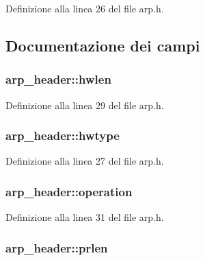 Definizione alla linea 26 del file arp.\+h.



\subsection{Documentazione dei campi}
\hypertarget{structarp__header_ad11b0f96095d8f44e6b21aaa3938df1f}{
\subsubsection[{hwlen}]{ arp\+\_\+header\+::hwlen}}\label{structarp__header_ad11b0f96095d8f44e6b21aaa3938df1f}


Definizione alla linea 29 del file arp.\+h.

\hypertarget{structarp__header_a571cbbe11fab087a17240660f28c19b9}{
\subsubsection[{hwtype}]{ arp\+\_\+header\+::hwtype}}\label{structarp__header_a571cbbe11fab087a17240660f28c19b9}


Definizione alla linea 27 del file arp.\+h.

\hypertarget{structarp__header_a115cbc3f70bdcb71f36ed74a02ce585f}{
\subsubsection[{operation}]{ arp\+\_\+header\+::operation}}\label{structarp__header_a115cbc3f70bdcb71f36ed74a02ce585f}


Definizione alla linea 31 del file arp.\+h.

\hypertarget{structarp__header_a9188068c8427afd6f989e98e37a6c9ce}{
\subsubsection[{prlen}]{ arp\+\_\+header\+::prlen}}\label{structarp__header_a9188068c8427afd6f989e98e37a6c9ce}


